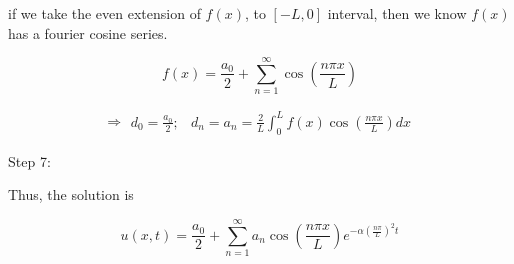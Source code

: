 \documentclass{article}
\begin{document}
if we take the even extension of $f(x)$, to $[-L, 0]$ interval, then we know $f(x)$ has a fourier cosine series. 

$$f(x) = \frac{a_0}{2} + \sum_{n = 1}^\infty \cos \left(\frac{n \pi x}{L} \right)$$

$$\Rightarrow \begin{matrix} d_0 = \frac{a_0}{2}; & d_n = a_n = \frac{2}{L} \int_0^L f(x) \cos \left(\frac{n \pi x}{L} \right) dx \end{matrix}$$

Step 7:

Thus, the solution is 

$$u(x,t) = \frac{a_0}{2} + \sum_{n = 1}^\infty a_n \cos \left(\frac{n \pi x}{L} \right) e^{- \alpha \left(\frac{n \pi}{L} \right)^2 t}$$
\end{document}
